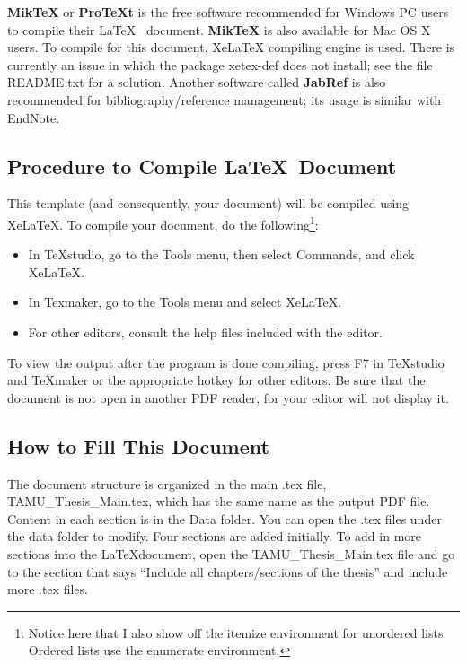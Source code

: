 \textbf{MikTeX} or \textbf{ProTeXt} is the free software recommended for Windows PC users to
compile their \LaTeX ~ document. \textbf{MikTeX} is also available for Mac OS X users. To compile for this document, XeLaTeX compiling engine is used. There is currently an issue in which the package xetex-def does not install; see the file README.txt for a solution. Another software called \textbf{JabRef} is also recommended for bibliography/reference management; its usage is similar with EndNote.

\subsection*{Procedure to Compile \LaTeX\ Document}

This template (and consequently, your document) will be compiled using XeLaTeX. To compile your document, do the following\footnote{Notice here that I also show off the itemize environment for unordered lists. Ordered lists use the enumerate environment.}:

\begin{itemize}
	\item In TeXstudio, go to the Tools menu, then select Commands, and click XeLaTeX.
	
	\item In Texmaker, go to the Tools menu and select XeLaTeX.
	
	\item For other editors, consult the help files included with the editor.
\end{itemize}

To view the output after the program is done compiling, press F7 in TeXstudio and TeXmaker or the appropriate hotkey for other editors. Be sure that the document is not open in another PDF reader, for your editor will not display it.

\subsection{How to Fill This Document}
The document structure is organized in the main .tex file, TAMU\_Thesis\_Main.tex,
which has the same name as the output PDF file. Content in each section is in the Data folder. You can open the .tex files under the data folder to modify. Four sections
are added initially. To add in more sections into the \LaTeX document, open the
TAMU\_Thesis\_Main.tex file and go to the section that says ``Include all chapters/sections of the thesis'' and include more .tex files.

